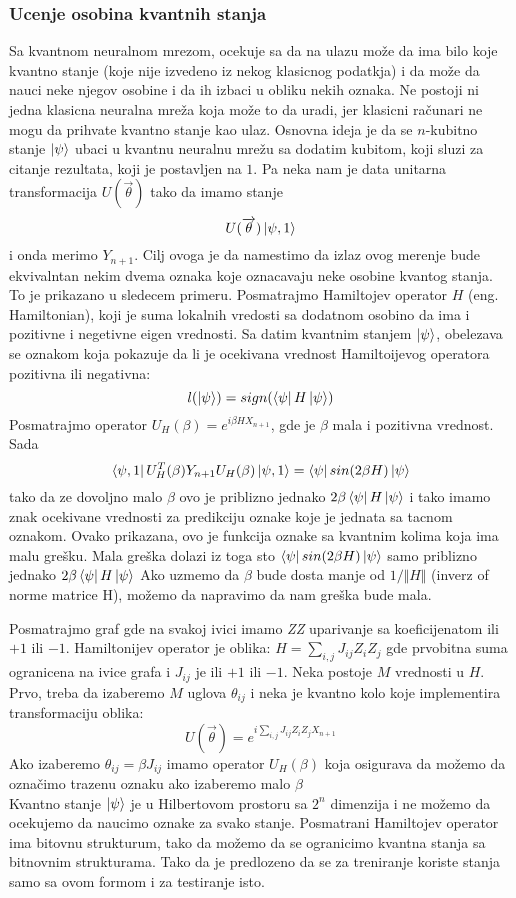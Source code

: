 \documentclass[12pt, letterpaper, oneside]{article}
\begin{document}
\subsubsection{Ucenje osobina kvantnih stanja}
Sa kvantnom neuralnom mrezom, ocekuje sa da na ulazu može da ima bilo koje kvantno stanje (koje nije izvedeno iz nekog klasicnog podatkja)
i da može da nauci neke njegov osobine i da ih izbaci u obliku nekih oznaka. Ne postoji ni jedna klasicna neuralna mreža koja može to da uradi, jer klasicni računari ne mogu da prihvate kvantno stanje kao ulaz.
Osnovna ideja je da se $n$-kubitno stanje $\Ket{\psi}$ ubaci u kvantnu neuralnu mrežu sa dodatim kubitom, koji sluzi za citanje rezultata, koji je postavljen na $1$.
Pa neka nam je data unitarna transformacija $U(\overrightarrow{\theta})$ tako da imamo stanje
\[
    U(\overrightarrow{\theta})\Ket{\psi,1}
\] 
i onda merimo $Y_{n+1}$. Cilj ovoga je da namestimo da izlaz ovog merenje bude ekvivalntan nekim dvema oznaka koje oznacavaju neke osobine kvantog stanja.
To je prikazano u sledecem primeru.
Posmatrajmo Hamiltojev operator $H$ (eng. Hamiltonian), koji je suma lokalnih vredosti sa dodatnom osobino da ima i pozitivne i negetivne eigen vrednosti.
Sa datim kvantnim stanjem $\ket{\psi}$, obelezava se oznakom koja pokazuje da li je ocekivana vrednost Hamiltoijevog operatora pozitivna ili negativna:
\[
    l(\Ket{\psi}) = sign(\bra{\psi}H\Ket{\psi})
\]
Posmatrajmo operator $U_H(\beta) = e^{i\beta HX_{n+1}}$, gde je $\beta$ mala i pozitivna vrednost. Sada
\[
    \Bra{\psi,1}U_H^T(\beta)Y_{n+1}U_H(\beta)\Ket{\psi,1} = \bra{\psi}sin(2\beta H)\Ket{\psi}
\]
tako da ze dovoljno malo $\beta$ ovo je priblizno jednako $2\beta\bra{\psi}H\Ket{\psi}$ i tako imamo znak ocekivane vrednosti za 
predikciju oznake koje je jednata sa tacnom oznakom. Ovako prikazana, ovo je funkcija oznake sa kvantnim kolima koja
ima malu grešku. Mala greška dolazi iz toga sto $\bra{\psi}sin(2\beta H)\Ket{\psi}$ samo priblizno jednako $2\beta\bra{\psi}H\Ket{\psi}$
Ako uzmemo da $\beta$ bude dosta manje od $1/\Vert H \Vert$ (inverz of norme matrice H), možemo da napravimo da nam greška bude mala.

Posmatrajmo graf gde na svakoj ivici imamo \textit{ZZ} uparivanje sa koeficijenatom ili $+1$ ili $-1$.
Hamiltonijev operator je oblika: $H = \sum_{i,j}J_{ij}Z_iZ_j$ gde prvobitna suma ogranicena na ivice grafa i $J_{ij}$ je ili $+1$ ili $-1$.
Neka postoje $M$ vrednosti u $H$. Prvo, treba da izaberemo $M$ uglova $\theta_{ij}$ i neka je kvantno kolo koje implementira transformaciju oblika:
\[
    U(\overrightarrow{\theta}) = e^{i\sum_{i,j}J_{ij}Z_iZ_jX_{n+1}}
\]
Ako izaberemo $\theta_{ij}=\beta J_{ij}$ imamo operator $U_H(\beta)$ koja osigurava da možemo da označimo trazenu oznaku
ako izaberemo malo $\beta$ \\
Kvantno stanje $\Ket{\psi}$ je u Hilbertovom prostoru sa $2^n$ dimenzija i ne možemo da ocekujemo da naucimo oznake za svako stanje.
Posmatrani Hamiltojev operator ima bitovnu strukturum, tako da možemo da se ogranicimo kvantna stanja sa bitnovnim strukturama.
Tako da je predlozeno da se za treniranje koriste stanja samo sa ovom formom i za testiranje isto.
\end{document}
